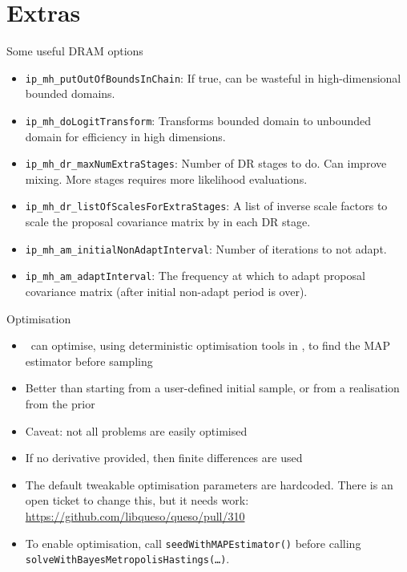 \section{Extras}
\begin{frame}[fragile]{Some useful DRAM options}
  \begin{itemize}
    \item \texttt{ip\_mh\_putOutOfBoundsInChain}:  If true, can be wasteful in
      high-dimensional bounded domains.
    \item \texttt{ip\_mh\_doLogitTransform}:  Transforms bounded domain to
      unbounded domain for efficiency in high dimensions.
    \item \texttt{ip\_mh\_dr\_maxNumExtraStages}:  Number of DR stages to do.
      Can improve mixing.  More stages requires more likelihood evaluations.
    \item \texttt{ip\_mh\_dr\_listOfScalesForExtraStages}:  A list of inverse
      scale factors to scale the proposal covariance matrix by in each DR
      stage.
    \item \texttt{ip\_mh\_am\_initialNonAdaptInterval}:  Number of iterations
      to not adapt.
    \item \texttt{ip\_mh\_am\_adaptInterval}:  The frequency at which to adapt
      proposal covariance matrix (after initial non-adapt period is over).
  \end{itemize}
\end{frame}

\begin{frame}[fragile]{Optimisation}
  \begin{itemize}
    \item \Queso\ can optimise, using deterministic optimisation tools in \Gsl,
      to find the MAP estimator before sampling
    \item Better than starting from a user-defined initial sample, or from a
      realisation from the prior
    \item Caveat:  not all problems are easily optimised
    \item If no derivative provided, then finite differences are used
    \item The default tweakable optimisation parameters are hardcoded.  There is
      an open ticket to change this, but it needs work:
      \url{https://github.com/libqueso/queso/pull/310}
    \item To enable optimisation, call \texttt{seedWithMAPEstimator()} before
      calling \texttt{solveWithBayesMetropolisHastings(\ldots)}.
  \end{itemize}
\end{frame}
